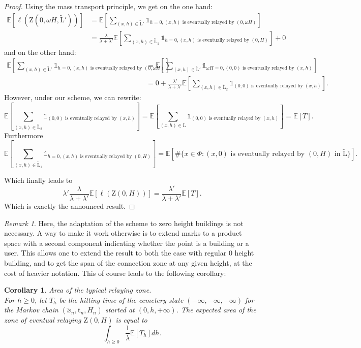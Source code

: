 \documentclass[10pt,english,a4paper]{smfart}
\newtheorem{corollary}{Corollary}[section]
\theoremstyle{definition}
\theoremstyle{remark}
\newtheorem{remark}{Remark}
\newcommand{\landsc}{\mathrm{L}}
\newcommand{\zone}{\mathrm{Z}}
\newcommand{\e}{\mathbb{E}}
\begin{document}
\begin{proof}
Using the mass transport principle, we get on the one hand:
\begin{align*}
    \e[\ell(\zone(0,\omega H, \tilde{\landsc}'))] &= \e\left[\sum_{(x, h)\in \tilde{\landsc}'} \mathds{1}_{h = 0, (x, h) \text{ is eventually relayed by } (0, \omega H)}\right]\\
    &= \frac{\lambda}{\lambda+\lambda'}\e\left[\sum_{(x, h)\in \tilde{\landsc}_1} \mathds{1}_{h = 0, (x, h) \text{ is eventually relayed by } (0,  H)}\right]+ 0
\end{align*}
and on the other hand:
\begin{align*}
    \e\left[\sum_{(x, h)\in \tilde{\landsc}'} \mathds{1}_{h = 0, (x, h) \text{ is eventually relayed by } (0, \omega H)}\right]&= \e\left[\sum_{(x, h)\in \tilde{\landsc}'} \mathds{1}_{\omega H= 0, (0, 0) \text{ is eventually relayed by } (x, h)}\right]\\
    &= 0+ \frac{\lambda'}{\lambda+\lambda'}\e\left[\sum_{(x, h)\in \tilde{\landsc}_2} \mathds{1}_{(0, 0) \text{ is eventually relayed by } (x,  h)}\right].
\end{align*}
However, under our scheme, we can rewrite:
\[\e\left[\sum_{(x, h)\in \tilde{\landsc}_2} \mathds{1}_{(0, 0) \text{ is eventually relayed by } (x,  h)}\right] = \e\left[\sum_{(x, h)\in \landsc} \mathds{1}_{(0, 0) \text{ is eventually relayed by } (x,  h)}\right] = \e[T].\]
Furthermore
\[\e\left[\sum_{(x, h)\in \tilde{\landsc}_1} \mathds{1}_{h = 0, (x, h) \text{ is eventually relayed by } (0,  H)}\right] = \e[\# \{x\in \Phi: (x, 0)\text{ is eventually relayed by } (0, H) \text{ in }\tilde{\landsc}\}].\]

Which finally leads to 
\[\lambda' \frac{\lambda}{\lambda+\lambda'} \e[\ell(\zone(0, H))] = \frac{\lambda'}{\lambda+\lambda'} \e[T].\]
Which is exactly the announced result.
\end{proof}

\begin{remark}
Here, the adaptation of the scheme to zero height buildings is not necessary. A way to make it work otherwise is to extend marks to a product space with a second component indicating whether the point is a building or a user. This allows one to extend the result to both the case with regular $0$ height building, and to get the span of the connection zone at any given height, at the cost of heavier notation. This of course leads to the following corollary:
\end{remark}
 \begin{corollary}\textit{Area of the typical relaying zone.}\\
 For $h\geq 0$, let $T_h$ be the hitting time of the cemetery state $(-\infty, -\infty, -\infty)$ for the Markov chain $(\tilde{x}_n, \mathrm{t}_n, H_n)$ started at 
$(0, h, +\infty)$. The expected area of the zone of eventual relaying $\zone (0, H)$ is equal to 
\[\int_{h\geq 0}\frac{1}{\lambda}\e[T_h]dh.\]
 \end{corollary}
 
\end{document}
